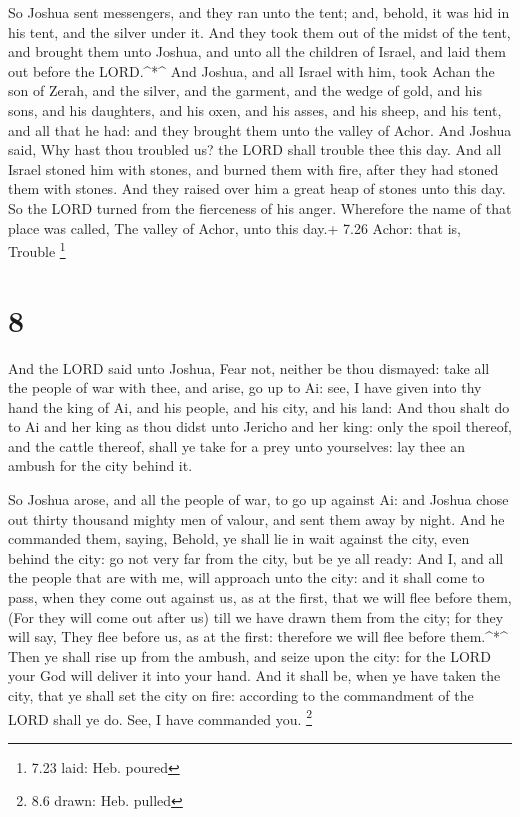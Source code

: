  So Joshua sent messengers, and they ran unto the tent;
and, behold, it was hid in his tent, and the silver under it.
 And they took them out of the midst of the tent, and
brought them unto Joshua, and unto all the children of Israel, and laid
them out before the LORD.\^{}*\^{}  And Joshua, and all
Israel with him, took Achan the son of Zerah, and the silver, and the
garment, and the wedge of gold, and his sons, and his daughters, and his
oxen, and his asses, and his sheep, and his tent, and all that he had:
and they brought them unto the valley of Achor.  And Joshua
said, Why hast thou troubled us? the LORD shall trouble thee this day.
And all Israel stoned him with stones, and burned them with fire, after
they had stoned them with stones.  And they raised over him
a great heap of stones unto this day. So the LORD turned from the
fierceness of his anger. Wherefore the name of that place was called,
The valley of Achor, unto this day.+ 7.26 Achor: that is, Trouble
\footnote{7.23 laid: Heb. poured}

\hypertarget{section-7}{%
\section{8}\label{section-7}}

 And the LORD said unto Joshua, Fear not, neither be thou
dismayed: take all the people of war with thee, and arise, go up to Ai:
see, I have given into thy hand the king of Ai, and his people, and his
city, and his land:  And thou shalt do to Ai and her king as
thou didst unto Jericho and her king: only the spoil thereof, and the
cattle thereof, shall ye take for a prey unto yourselves: lay thee an
ambush for the city behind it.

 So Joshua arose, and all the people of war, to go up
against Ai: and Joshua chose out thirty thousand mighty men of valour,
and sent them away by night.  And he commanded them, saying,
Behold, ye shall lie in wait against the city, even behind the city: go
not very far from the city, but be ye all ready:  And I, and
all the people that are with me, will approach unto the city: and it
shall come to pass, when they come out against us, as at the first, that
we will flee before them,  (For they will come out after us)
till we have drawn them from the city; for they will say, They flee
before us, as at the first: therefore we will flee before them.\^{}*\^{}
 Then ye shall rise up from the ambush, and seize upon the
city: for the LORD your God will deliver it into your hand. 
And it shall be, when ye have taken the city, that ye shall set the city
on fire: according to the commandment of the LORD shall ye do. See, I
have commanded you. \footnote{8.6 drawn: Heb. pulled}

